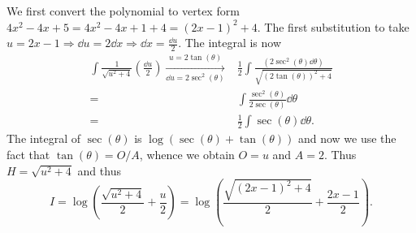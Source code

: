 \documentclass[12pt]{article}
\theoremstyle{plain}
\theoremstyle{definition}
\theoremstyle{remark}
\newcommand{\te}{\theta}                %
\renewcommand{\:}{\colon}           %
\newcommand{\half}{\frac12}
\renewcommand{\.}{\Cdot}                %
\newcommand{\To}{\Rightarrow}
\begin{document}
          
          \begin{ptcb}
      We first convert the polynomial to vertex form $4x^2-4x+5=4x^2-4x+1+4=(2x-1)^2+4$. The first substitution to take $u=2x-1\To\dd u=2\dd x\To \dd x=\frac{\dd u}{2}$. The integral is now 
      \begin{align*}
        \int \frac{1}{\sqrt{u^2+4}}\left(\frac{\dd u}{2}\right)\xrightarrow[\dd u=2\sec^2(\te)]{u=2\tan(\te)}&\frac{1}{2}\int\frac{(2\sec^2(\te)\dd \te)}{\sqrt{(2\tan(\te))^2+4}}\\
        =&\int\frac{\sec^2(\te)}{2\sec(\te)}\dd\te\\
        =&\half\int\sec(\te)\dd\te.
      \end{align*}
      The integral of $\sec(\te)$ is $\log(\sec(\te)+\tan(\te))$ and now we use the fact that $\tan(\te)=O/A$, whence we obtain $O=u$ and $A=2$. Thus $H=\sqrt{u^2+4}$ and thus
      $$I=\log\left(\frac{\sqrt{u^2+4}}{2}+\frac{u}{2}\right)=\log\left(\frac{\sqrt{(2x-1)^2+4}}{2}+\frac{2x-1}{2}\right).$$
            \end{ptcb}

\end{document}
